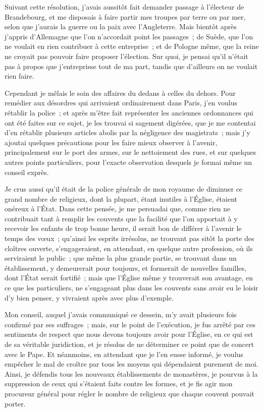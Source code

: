 \documentclass[french,twoside]{book} %
\begin{document}
Suivant cette résolution, j’avais aussitôt fait demander passage à l’électeur de Brandebourg, et me disposais à faire partir mes troupes par terre ou par mer, selon que j’aurais la guerre ou la paix avec l’Angleterre. Mais bientôt après j’appris d’Allemagne que l’on n’accordait point les passages ; de Suède, que l’on ne voulait en rien contribuer à cette entreprise ; et de Pologne même, que la reine ne croyait pas pouvoir faire proposer l’élection. Sur quoi, je pensai qu’il n’était pas à propos que j’entreprisse tout de ma part, tandis que d’ailleurs on ne voulait rien faire.\par
Cependant je mêlais le soin des affaires du dedans à celles du dehors. Pour remédier aux désordres qui arrivaient ordinairement dans Paris, j’en voulus rétablir la police ; et après m’être fait représenter les anciennes ordonnances qui ont été faites sur ce sujet, je les trouvai si sagement digérées, que je me contentai d’en rétablir plusieurs articles abolis par la négligence des magistrats ; mais j’y ajoutai quelques précautions pour les faire mieux observer à l’avenir, principalement sur le port des armes, sur le nettoiement des rues, et sur quelques autres points particuliers, pour l’exacte observation desquels je formai même un conseil exprès.\par
Je crus aussi qu’il était de la police générale de mon royaume de diminuer ce grand nombre de religieux, dont la plupart, étant inutiles à l’Église, étaient onéreux à l’État. Dans cette pensée, je me persuadai que, comme rien ne contribuait tant à remplir les couvents que la facilité que l’on apportait à y recevoir les enfants de trop bonne heure, il serait bon de différer à l’avenir le temps des vœux ; qu’ainsi les esprits irrésolus, ne trouvant pas sitôt la porte des cloîtres ouverte, s’engageraient, en attendant, en quelque autre profession, où ils serviraient le public ; que même la plus grande partie, se trouvant dans un établissement, y demeurerait pour toujours, et formerait de nouvelles familles, dont l’État serait fortifié ; mais que l’Église même y trouverait son avantage, en ce que les particuliers, ne s’engageant plus dans les couvents sans avoir eu le loisir d’y bien penser, y vivraient après avec plus d’exemple.\par
Mon conseil, auquel j’avais communiqué ce dessein, m’y avait plusieurs fois confirmé par ses suffrages ; mais, sur le point de l’exécution, je fus arrêté par ces sentiments de respect que nous devons toujours avoir pour l’Église, en ce qui est de sa véritable juridiction, et je résolus de ne déterminer ce point que de concert avec le Pape. Et néanmoins, en attendant que je l’en eusse informé, je voulus empêcher le mal de croître par tous les moyens qui dépendaient purement de moi. Ainsi, je défendis tous les nouveaux établissements de monastères, je pourvus à la suppression de ceux qui s’étaient faits contre les formes, et je fis agir mon procureur général pour régler le nombre de religieux que chaque couvent pouvait porter.\par
\end{document}
